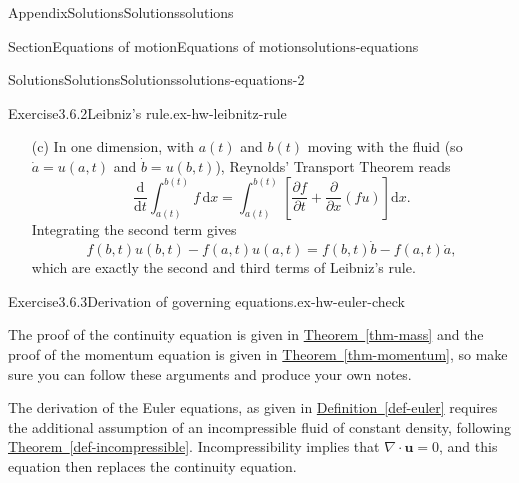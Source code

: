 \documentclass[oneside,10pt,]{book}
\newcommand{\xreffont}{\relax}
\numberwithin{equation}{section}
\newcommand{\de}{\mathrm{d}}
\newcommand{\dd}[2]{\frac{\de#1}{\de#2}}
\newcommand{\pd}[2]{\frac{\partial#1}{\partial#2}}
\newcommand{\bu}{\boldsymbol{u}}
\begin{document}
\begin{appendixptx}{Appendix}{Solutions}{}{Solutions}{}{}{solutions}
\begin{sectionptx}{Section}{Equations of motion}{}{Equations of motion}{}{}{solutions-equations}
\begin{solutions-subsection-numberless}{Solutions}{Solutions}{}{Solutions}{}{}{solutions-equations-2}
\begin{divisionsolution}{Exercise}{3.6.2}{Leibniz's rule.}{ex-hw-leibnitz-rule}
\begin{enumerate}[font=\bfseries,label=(\alph*),ref=\alph*]
\begin{equation*}
\frac{1}{\Delta t}\int_{b(t)}^{b(t + \Delta t)} f(x, t + \Delta t) \, \de{x} \approx
f(b(t), t) \, \frac{b(t + \Delta t) - b(t)}{\Delta t}.
\end{equation*}
Since \(f\) is continuous, the error in this approximation is small compared with \(\Delta t\), and so disappears in the limit. The term therefore tends to \(f(b(t),
t)\,\dot{b}(t)\).%
\par
\emph{Third term.} In the same way, this tends to \(-f(a(t), t)\,\dot{a}(t)\).%
\par
Adding the three limits gives Leibniz's rule \hyperref[eqn-leibnitz-rule]{({\xreffont\ref{eqn-leibnitz-rule}})}.%
\item[(c)]\noindent\hypertarget{ex-hw-leibnitz-rule-5-2-main}{}In one dimension, with \(a(t)\) and \(b(t)\) moving with the fluid (so \(\dot{a} = u(a, t)\) and \(\dot{b} = u(b, t)\)), Reynolds' Transport Theorem reads%
\begin{equation*}
\dd{}{t} \int_{a(t)}^{b(t)} f \, \de{x} = \int_{a(t)}^{b(t)} \left[ \pd{f}{t} +
\pd{}{x}(f u) \right] \de{x}.
\end{equation*}
Integrating the second term gives%
\begin{equation*}
f(b, t)u(b, t) - f(a, t)u(a, t) = f(b, t)\dot{b} - f(a, t)\dot{a},
\end{equation*}
which are exactly the second and third terms of Leibniz's rule.%
\end{enumerate}%
\end{divisionsolution}%
\begin{divisionsolution}{Exercise}{3.6.3}{Derivation of governing equations.}{ex-hw-euler-check}%
\par\smallskip%
\noindent\hypertarget{ex-hw-euler-check-3-main}{}The proof of the continuity equation is given in \hyperref[thm-mass]{Theorem~{\xreffont\ref{thm-mass}}} and the proof of the momentum equation is given in \hyperref[thm-momentum]{Theorem~{\xreffont\ref{thm-momentum}}}, so make sure you can follow these arguments and produce your own notes.%
\par
The derivation of the Euler equations, as given in \hyperref[def-euler]{Definition~{\xreffont\ref{def-euler}}} requires the additional assumption of an incompressible fluid of constant density, following \hyperref[def-incompressible]{Theorem~{\xreffont\ref{def-incompressible}}}. Incompressibility implies that \(\nabla \cdot \bu = 0\), and this equation then replaces the continuity equation.%
\end{divisionsolution}%

\end{solutions-subsection-numberless}
\end{sectionptx}
\end{appendixptx}
\end{document}
